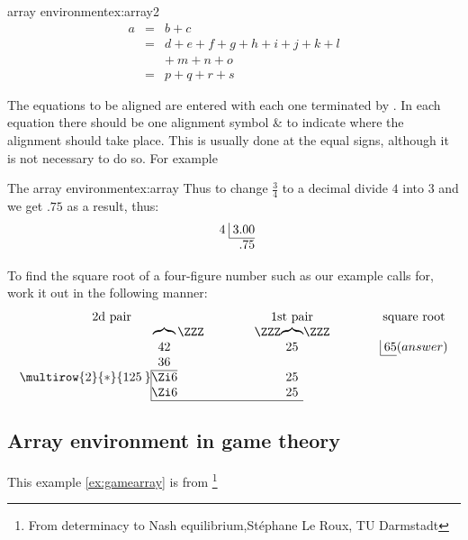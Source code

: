 \begin{texexample}{array environment}{ex:array2}
\begin{eqnarray}
  a & = & b + c \\
    & = & d + e + f + g + h + i
               + j + k + l \nonumber \\
    && +\: m + n + o \\
   & = & p + q + r + s
\end{eqnarray}
\end{texexample}

The equations
to be aligned are entered with each one terminated by \doccmd{\cr}. In each equation there should be
one alignment symbol \& to indicate where the alignment should take place. This is usually
done at the equal signs, although it is not necessary to do so. For example


\begin{texexample}{The array environment}{ex:array}
Thus to change $\frac34$ to a decimal divide $4$ into $3$
and we get $.75$ as a result, thus:
\[
\begin{array}{r@{}r@{}}
4 \; & \vline \; 3.00 \\\cline{2-2}
     &            .75
\end{array}
\]

To find the square root of a four-figure number
such as our example calls for, work it out in the
following manner:
\[
\arraycolsep=0em
\begin{array}{cccccccccccc}
\multicolumn{3}{c}{\text{2d pair}} &\qquad&\qquad&
\multicolumn{3}{c}{\text{1st pair}}&\qquad&\qquad&
\multicolumn{2}{c}{\text{square root}}\\
 & \overbrace{\quad}&\ZZZ&&&\ZZZ&\overbrace{\quad}&\ZZZ\\
 & 42 &&&&& 25 &&&&\vline\;65&(answer)\\\cline{11-11}
 & 36 &&&&& \\\cline{2-2}
\multirow{2}{*}{125\:} & \vline\hfill \Zi6 \hfill&&&&& 25\\
 & \vline\hfill \Zi6 \hfill&&&&& 25\\\cline{2-7}
\end{array}
\]
\end{texexample}


\subsection{Array environment in game theory}

This example \ref{ex:gamearray} is from \footnote{From determinacy to Nash equilibrium,St\'ephane Le Roux, TU Darmstadt }

